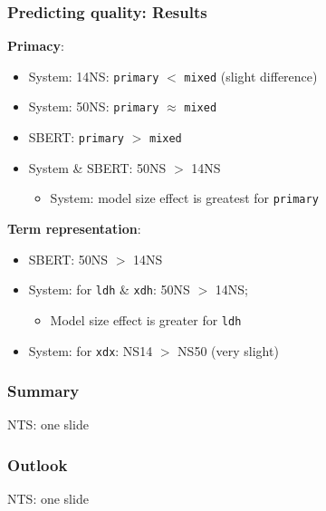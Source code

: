 \documentclass[handout,xcolor={dvipsnames}]{beamer}
\newcommand{\param}[1]{\texttt{#1}}
\begin{document}
\begin{frame}
\frametitle{Predicting quality: Results}

\vspace{-.5em}

\pause
\textbf{Primacy}:
\begin{itemize}
\pause
\item System: 14NS: \param{primary} $<$ \param{mixed} (slight difference)
\pause
\item System: 50NS: \param{primary} $\approx$ \param{mixed}
\pause
\item SBERT: \param{primary} $>$ \param{mixed}
\pause
\item System \& SBERT: 50NS $>$ 14NS
\begin{itemize}
\pause
\item System: model size effect is greatest for \param{primary}
\end{itemize}
\end{itemize}

\vspace{1em}

\pause
\textbf{Term representation}:
\begin{itemize}
\pause
\item SBERT: 50NS $>$ 14NS
\pause
\item System: for \param{ldh} \& \param{xdh}: 50NS $>$ 14NS;
\begin{itemize}
\pause
\item Model size effect is greater for \param{ldh}
\end{itemize}
\pause
\item System: for \param{xdx}: NS14 $>$ NS50 (very slight)
\end{itemize}

\end{frame}


\begin{frame}
\frametitle{Summary}
NTS: one slide
\end{frame}

\begin{frame}
\frametitle{Outlook}
NTS: one slide
\end{frame}
\end{document}

